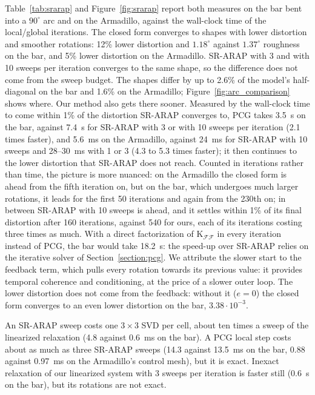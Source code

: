 \documentclass{birkjour}
\theoremstyle{remark}
\numberwithin{equation}{section}
\begin{document}
Table~\ref{tab:srarap} and Figure~\ref{fig:srarap} report both measures on the bar bent into a $90^\circ$ arc and on the Armadillo, against the wall-clock time of the local/global iterations. The closed form converges to shapes with lower distortion and smoother rotations: 12\% lower distortion and $1.18^\circ$ against $1.37^\circ$ roughness on the bar, and 5\% lower distortion on the Armadillo. SR-ARAP with 3 and with 10 sweeps per iteration converges to the same shape, so the difference does not come from the sweep budget. The shapes differ by up to 2.6\% of the model's half-diagonal on the bar and 1.6\% on the Armadillo; Figure~\ref{fig:arc_comparison} shows where. Our method also gets there sooner. Measured by the wall-clock time to come within 1\% of the distortion SR-ARAP converges to, PCG takes 3.5~s on the bar, against 7.4~s for SR-ARAP with 3 or with 10 sweeps per iteration (2.1 times faster), and 5.6~ms on the Armadillo, against 24~ms for SR-ARAP with 10 sweeps and 28--30~ms with 1 or 3 (4.3 to 5.3 times faster); it then continues to the lower distortion that SR-ARAP does not reach. Counted in iterations rather than time, the picture is more nuanced: on the Armadillo the closed form is ahead from the fifth iteration on, but on the bar, which undergoes much larger rotations, it leads for the first 50 iterations and again from the 230th on; in between SR-ARAP with 10 sweeps is ahead, and it settles within 1\% of its final distortion after 160 iterations, against 540 for ours, each of its iterations costing three times as much. With a direct factorization of $\mathrm K_{\mathcal F \mathcal F}$ in every iteration instead of PCG, the bar would take 18.2~s: the speed-up over SR-ARAP relies on the iterative solver of Section~\ref{section:pcg}. We attribute the slower start to the feedback term, which pulls every rotation towards its previous value: it provides temporal coherence and conditioning, at the price of a slower outer loop. The lower distortion does not come from the feedback: without it ($e = 0$) the closed form converges to an even lower distortion on the bar, $3.38 \cdot 10^{-3}$.

An SR-ARAP sweep costs one $3 \times 3$ SVD per cell, about ten times a sweep of the linearized relaxation (4.8 against 0.6~ms on the bar). A PCG local step costs about as much as three SR-ARAP sweeps (14.3 against 13.5~ms on the bar, 0.88 against 0.97~ms on the Armadillo's control mesh), but it is exact. Inexact relaxation of our linearized system with 3 sweeps per iteration is faster still (0.6~s on the bar), but its rotations are not exact.
\end{document}
